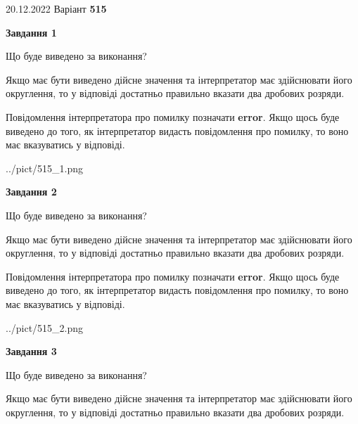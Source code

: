 \documentclass[12pt, ukrainian]{article}
\begin{document}
{20.12.2022 Варіант \No \textbf { 515 }\par}
{
\begin {Large}

{\begin {center}\textbf{Завдання 1}\end {center}}\par
Що буде виведено за виконання? \par

Якщо має бути виведено дійсне значення та інтерпретатор має здійснювати його округлення, 
то у відповіді достатньо правильно вказати два дробових розряди.

Повідомлення інтерпретатора про помилку позначати \textbf{error}.
Якщо щось буде виведено до того, як інтерпретатор видасть повідомлення про помилку, 
то воно має вказуватись у відповіді. \par

\begin{center}
	{../pict/515_1.png}
\end{center}
\newpage

{\begin {center}\textbf{Завдання 2}\end {center}}\par
Що буде виведено за виконання? \par

Якщо має бути виведено дійсне значення та інтерпретатор має здійснювати його округлення, 
то у відповіді достатньо правильно вказати два дробових розряди.

Повідомлення інтерпретатора про помилку позначати \textbf{error}.
Якщо щось буде виведено до того, як інтерпретатор видасть повідомлення про помилку, 
то воно має вказуватись у відповіді. \par

\begin{center}
	{../pict/515_2.png}
\end{center}
\newpage

{\begin {center}\textbf{Завдання 3}\end {center}}\par
Що буде виведено за виконання? \par

Якщо має бути виведено дійсне значення та інтерпретатор має здійснювати його округлення, 
то у відповіді достатньо правильно вказати два дробових розряди.


\end{Large}}
\end{document}
